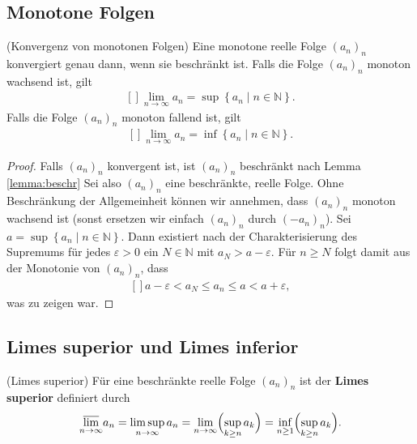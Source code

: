 \documentclass[../Analysis1_script.tex]{subfiles}
\begin{document}
\subsection{Monotone Folgen}
\begin{proposition}{(Konvergenz von monotonen Folgen)}
	Eine monotone reelle Folge $(a_n)_n$ konvergiert genau dann, wenn sie beschränkt ist. Falls die Folge $(a_n)_n$ monoton wachsend ist, gilt
	\[\begin{aligned}[]
		\lim _{n\to \infty }a_n = \sup \left \lbrace {a_n} \mid {n \in \mathbb {N}}\right \rbrace .
	\end{aligned}\]
	Falls die Folge $(a_n)_n$ monoton fallend ist, gilt
	\[\begin{aligned}[]
		\lim _{n\to \infty }a_n = \inf \left \lbrace {a_n} \mid {n \in \mathbb {N}}\right \rbrace .
	\end{aligned}\]
\end{proposition}

\begin{proof}
	Falls $(a_n)_n$ konvergent ist, ist $(a_n)_n$ beschränkt nach Lemma \ref{lemma:beschr} Sei also $(a_n)_n$ eine beschränkte, reelle Folge. Ohne Beschränkung der Allgemeinheit können wir annehmen, dass $(a_n)_n$ monoton wachsend ist (sonst ersetzen wir einfach $(a_n)_n$ durch $(-a_n)_n$). Sei $a = \sup \left \lbrace {a_n} \mid {n \in \mathbb {N}}\right \rbrace$. Dann existiert nach der Charakterisierung des Supremums für jedes $\varepsilon >0$ ein $N \in \mathbb {N}$ mit $a_N > a- \varepsilon$. Für $n \geq N$ folgt damit aus der Monotonie von $(a_n)_n$, dass
	\[\begin{aligned}[]
		a-\varepsilon < a_N \leq a_n \leq a < a+\varepsilon ,
	\end{aligned}\]
	was zu zeigen war. 
\end{proof} 

\subsection{Limes superior und Limes inferior}

\begin{definition}{(Limes superior)}
	Für eine beschränkte reelle Folge $(a_n)_n$ ist der \textbf{Limes superior} definiert durch
	\[\begin{aligned}[]
		\mathchoice {\underset {{n\to \infty }}{\overline {\lim }}}{\overline {\lim }_{{n\to \infty }}\, }{\overline {\lim }_{{n\to \infty }}\, }{\overline {\lim }_{{n\to \infty }}\, } a_n = \limsup _{n \to \infty }a_n = \lim _{n\to \infty }\Bigl (\sup _{k \geq n}a_k\Bigr ) = \inf _{n \geq 1}\Bigl (\sup _{k \geq n}a_k\Bigr ).
	\end{aligned}\] 
\end{definition}
\end{document}

